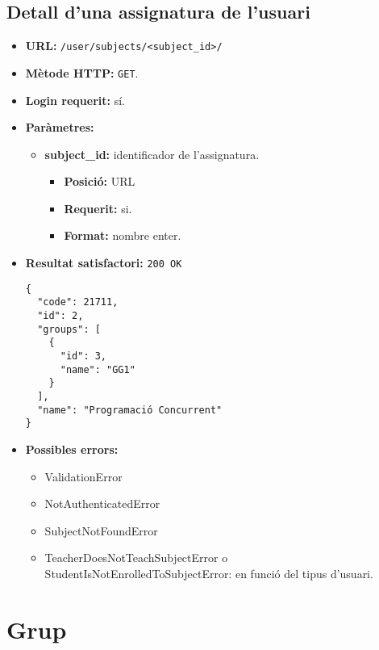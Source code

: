 \subsection{Detall d'una assignatura de l'usuari}
\begin{itemize}
\item \textbf{\ac{URL}:} \texttt{/user/subjects/<subject\_id>/}
\item \textbf{Mètode \ac{HTTP}: } \texttt{GET}.
\item \textbf{Login requerit:} sí.
\item \textbf{Paràmetres:}
	\begin{itemize}
		\item \textbf{subject\_id:} identificador de l'assignatura.
		\begin{itemize}
			\item \textbf{Posició:} \ac{URL}
			\item \textbf{Requerit:} si.
			\item \textbf{Format:} nombre enter.
		\end{itemize}
	\end{itemize}

\item \textbf{Resultat satisfactori:} \texttt{200 OK}
	\begin{verbatim}
{
  "code": 21711,
  "id": 2,
  "groups": [
    {
      "id": 3,
      "name": "GG1"
    }
  ],
  "name": "Programació Concurrent"
}
	\end{verbatim}
	
	
\item \textbf{Possibles errors:}
	\begin{itemize}
		\item ValidationError
		\item NotAuthenticatedError
		\item SubjectNotFoundError
		\item TeacherDoesNotTeachSubjectError o StudentIsNotEnrolledToSubjectError: en funció del tipus d'usuari.
	\end{itemize}
\end{itemize}


\section{Grup}

